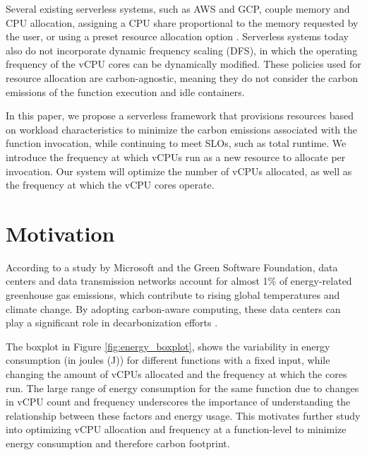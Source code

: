\documentclass[times, 10pt,twocolumn]{article}
\begin{document}
Several existing serverless systems, such as AWS and GCP, couple memory and CPU allocation, assigning a CPU share proportional to the memory requested by the user, or using a preset resource allocation option \cite{bibal2023acm}. Serverless systems today also do not incorporate dynamic frequency scaling (DFS), in which the operating frequency of the vCPU cores can be dynamically modified. These policies used for resource allocation are carbon-agnostic, meaning they do not consider the carbon emissions of the function execution and idle containers.

In this paper, we propose a serverless framework that provisions resources based on workload characteristics to minimize the carbon emissions associated with the function invocation, while continuing to meet SLOs, such as total runtime. We introduce the frequency at which vCPUs run as a new resource to allocate per invocation. Our system will optimize the number of vCPUs allocated, as well as the frequency at which the vCPU cores operate. 

\section{Motivation}

According to a study by Microsoft and the Green Software Foundation, data centers and data transmission networks account for almost 1\% of energy-related greenhouse gas emissions, which contribute to rising global temperatures and climate change. By adopting carbon-aware computing, these data centers can play a significant role in decarbonization efforts \cite{carbon_aware_computing}. 



The boxplot in Figure \ref{fig:energy_boxplot}, 
shows the variability in energy consumption (in joules (J)) for different functions with a fixed input, while changing the amount of vCPUs allocated and the frequency at which the cores run. The large range of energy consumption for the same function due to changes in vCPU count and frequency underscores the importance of understanding the relationship between these factors and energy usage. This motivates further study into optimizing vCPU allocation and frequency at a function-level to minimize energy consumption and therefore carbon footprint. 
\end{document}
